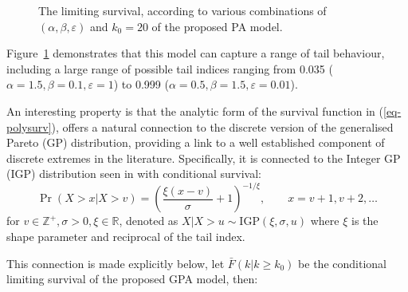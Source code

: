 \documentclass[
  sn-basic,
  10pt,
]{sn-jnl}
\theoremstyle{plain}
\theoremstyle{plain}
\theoremstyle{remark}
\begin{document}
\begin{figure}


\caption{\label{fig-polylinsurv}The limiting survival, according to
various combinations of \((\alpha, \beta, \varepsilon)\) and \(k_0=20\)
of the proposed PA model.}

\end{figure}%

Figure~\ref{fig-polylinsurv} demonstrates that this model can capture a
range of tail behaviour, including a large range of possible tail
indices ranging from 0.035 (\(\alpha=1.5, \beta=0.1, \varepsilon=1\)) to
0.999 (\(\alpha=0.5, \beta=1.5, \varepsilon=0.01\)).

An interesting property is that the analytic form of the survival
function in (\ref{eq-polysurv}), offers a natural connection to the
discrete version of the generalised Pareto (GP) distribution, providing
a link to a well established component of discrete extremes in the
literature. Specifically, it is connected to the Integer GP (IGP)
distribution seen in \citet{Rohrbeck_2018} with conditional survival: \[
\Pr(X> x|X> v) = \left(\frac{\xi(x-v)}{\sigma} + 1\right)^{-1/\xi},\qquad  x=v+1,v+2,\ldots
\] for \(v\in\mathbb Z^+, \sigma>0,\xi\in \mathbb R\), denoted as
\(X|X>u \sim  \mathrm {IGP}(\xi, \sigma, u)\) where \(\xi\) is the shape
parameter and reciprocal of the tail index.

This connection is made explicitly below, let \(\bar F (k|k\ge k_0)\) be
the conditional limiting survival of the proposed GPA model, then:
\end{document}
